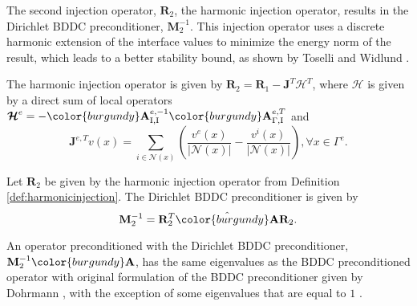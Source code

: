 The second injection operator, $\mathbf{R}_2$, the harmonic injection operator, results in the Dirichlet BDDC preconditioner, $\mathbf{M}^{-1}_2$.
This injection operator uses a discrete harmonic extension of the interface values to minimize the energy norm of the result, which leads to a better stability bound, as shown by Toselli and Widlund \cite{toselli2006domain}.

\begin{definition}
The harmonic injection operator is given by $\mathbf{R}_2 = \mathbf{R}_1 - \mathbf{J}^T \boldsymbol{\mathcal{H}}^T$, where $\boldsymbol{\mathcal{H}}$ is given by a direct sum of local operators $\boldsymbol{\mathcal{H}}^e = - {\color{burgundy}\mathbf{A}}_{\text{I}, \text{I}}^{e, -1} {\color{burgundy}\mathbf{A}}_{\Gamma, \text{I}}^{e, T}$ and
\begin{equation}
\mathbf{J}^{e, T} v \left( x \right) = \sum_{i \in \mathcal{N} \left( x \right)} \left( \frac{v^e \left( x \right)}{\lvert \mathcal{N} \left( x \right) \rvert} - \frac{v^i \left( x \right)}{\lvert \mathcal{N} \left( x \right) \rvert} \right), \forall x \in \Gamma^e.
\end{equation}
\label{def:harmonicinjection}
\end{definition}

\begin{definition}
Let $\mathbf{R}_2$ be given by the harmonic injection operator from Definition \ref{def:harmonicinjection}.
The Dirichlet BDDC preconditioner is given by 
\begin{equation}
\mathbf{M}^{-1}_2 = \mathbf{R}_2^T \hat{\color{burgundy}\mathbf{A}} \mathbf{R}_2.
\end{equation}
\label{def:dirichletbddc}
\end{definition}

An operator preconditioned with the Dirichlet BDDC preconditioner, $\mathbf{M}^{-1}_2 {\color{burgundy}\mathbf{A}}$, has the same eigenvalues as the BDDC preconditioned operator with original formulation of the BDDC preconditioner given by Dohrmann \cite{dohrmann2003preconditioner}, with the exception of some eigenvalues that are equal to $1$ \cite{li2007use}.
